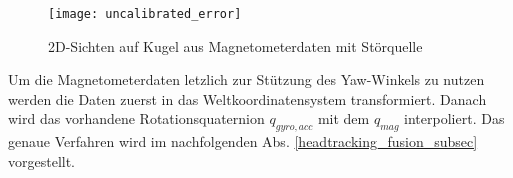\begin{figure}[ht]
\centering

    \texttt{[image: uncalibrated\_error]}
    \label{fig:uncalibrated_error}

\caption[]{2D-Sichten auf Kugel aus Magnetometerdaten mit Störquelle}
\label{fig:uncalibrated_error}
\end{figure}

Um die Magnetometerdaten letzlich zur Stützung des Yaw-Winkels zu nutzen werden die Daten zuerst in das Weltkoordinatensystem transformiert.
Danach wird das vorhandene Rotationsquaternion $q_{gyro,acc}$ mit dem $q_{mag}$ interpoliert.
Das genaue Verfahren wird im nachfolgenden Abs. \ref{headtracking_fusion_subsec}  vorgestellt.
